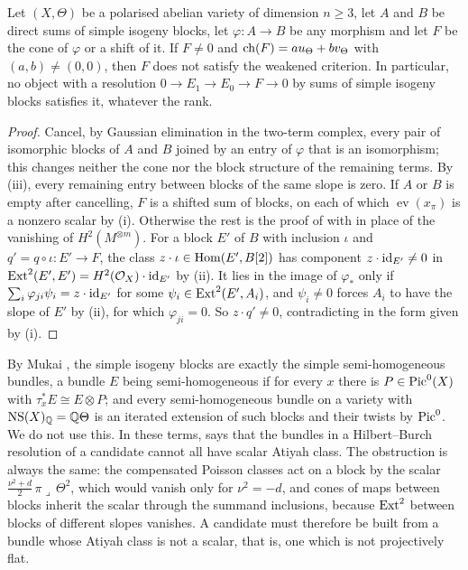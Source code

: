 \begin{theorem}
\label{thm:noblocks}
Let $(X,\Theta)$ be a polarised abelian variety of dimension $n\ge3$, let $A$
and $B$ be direct sums of simple isogeny blocks, let $\varphi\colon A\to B$
be any morphism and let $F$ be the cone of $\varphi$ or a shift of it. If
$F\ne0$ and $\operatorname{ch}(F)=au_{\Theta}+bv_{\Theta}$ with $(a,b)\ne(0,0)$, then $F$
does not satisfy the weakened criterion. In particular, no object with a
resolution $0\to E_{1}\to E_{0}\to F\to0$ by sums of simple isogeny blocks
satisfies it, whatever the rank.
\end{theorem}

\begin{proof}
Cancel, by Gaussian elimination in the two-term complex, every pair of
isomorphic blocks of $A$ and $B$ joined by an entry of $\varphi$ that is an
isomorphism; this changes neither the cone nor the block structure of the
remaining terms. By (iii), every remaining entry between
blocks of the same slope is zero. If $A$ or $B$ is empty after cancelling,
$F$ is a shifted sum of blocks, on each of which $\operatorname{ev}(x_{\pi})$
is a nonzero scalar by (i). Otherwise the rest is the proof of
 with  in place of the vanishing of
$H^{2}(M^{\otimes m})$. For a block $E'$ of $B$ with inclusion $\iota$ and
$q'=q\circ\iota\colon E'\to F$, the class $z\cdot\iota\in\operatorname{Hom}(E',B[2])$ has
component $z\cdot\operatorname{id}_{E'}\ne0$ in $\operatorname{Ext}^{2}(E',E')=H^{2}(\mathcal{O}_{X})\cdot\operatorname{id}_{E'}$
by (ii). It lies in the image of $\varphi_{*}$ only if
$\sum_{i}\varphi_{ji}\psi_{i}=z\cdot\operatorname{id}_{E'}$ for some
$\psi_{i}\in\operatorname{Ext}^{2}(E',A_{i})$, and $\psi_{i}\ne0$ forces $A_{i}$ to have
the slope of $E'$ by (ii), for which $\varphi_{ji}=0$. So $z\cdot q'\ne0$,
contradicting  in the form given by (i).
\end{proof}

\begin{remark}\label{rem:blocks}
By Mukai \cite{Muk78}, the simple isogeny blocks are exactly the simple
semi-homogeneous bundles, a bundle $E$ being semi-homogeneous if for every
$x$ there is $P\in\operatorname{Pic}^{0}(X)$ with $\tau_{x}^{*}E\cong E\otimes P$; and
every semi-homogeneous bundle on a variety with $\mathrm{NS}(X)_{\mathbb{Q}}=\mathbb{Q}\Theta$ is
an iterated extension of such blocks and their twists by $\operatorname{Pic}^{0}$. We do
not use this. In these terms,  says that the bundles in a
Hilbert--Burch resolution of a candidate cannot all have scalar Atiyah
class. The obstruction is always the same: the compensated Poisson classes
act on a block by the scalar $\tfrac{\nu^{2}+d}{2}\,\pi\lrcorner\,\Theta^{2}$,
which would vanish only for $\nu^{2}=-d$, and cones of maps between blocks
inherit the scalar through the summand inclusions, because $\operatorname{Ext}^{2}$
between blocks of different slopes vanishes. A candidate must therefore be
built from a bundle whose Atiyah class is not a scalar, that is, one which
is not projectively flat.
\end{remark}

